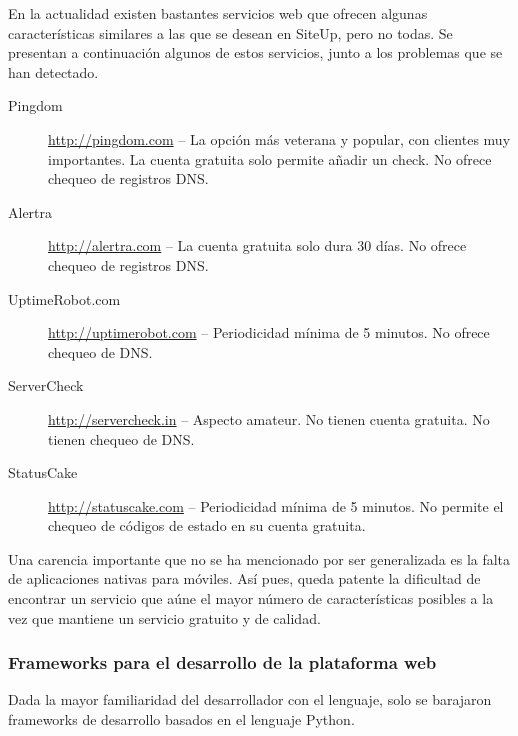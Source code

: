 En la actualidad existen bastantes servicios web que ofrecen algunas
características similares a las que se desean en SiteUp, pero no todas. Se
presentan a continuación algunos de estos servicios, junto a los problemas que
se han detectado.

\begin{description}
\item[Pingdom] \url{http://pingdom.com} -- La opción más veterana y popular, con
  clientes muy importantes. La cuenta gratuita solo permite añadir un check. No
  ofrece chequeo de registros DNS.
\item[Alertra] \url{http://alertra.com} -- La cuenta gratuita solo dura 30
  días. No ofrece chequeo de registros DNS.
\item[UptimeRobot.com] \url{http://uptimerobot.com} -- Periodicidad mínima de 5
  minutos. No ofrece chequeo de DNS.
\item[ServerCheck] \url{http://servercheck.in} -- Aspecto amateur. No tienen
  cuenta gratuita. No tienen chequeo de DNS.
\item[StatusCake] \url{http://statuscake.com} -- Periodicidad mínima de 5
  minutos. No permite el chequeo de códigos de estado en su cuenta gratuita.

\end{description}

Una carencia importante que no se ha mencionado por ser generalizada es la falta
de aplicaciones nativas para móviles. Así pues, queda patente la dificultad de
encontrar un servicio que aúne el mayor número de características posibles a la
vez que mantiene un servicio gratuito y de calidad.

\subsubsection{Frameworks para el desarrollo de la plataforma web}

Dada la mayor familiaridad del desarrollador con el lenguaje, solo se barajaron
frameworks de desarrollo basados en el lenguaje Python.

